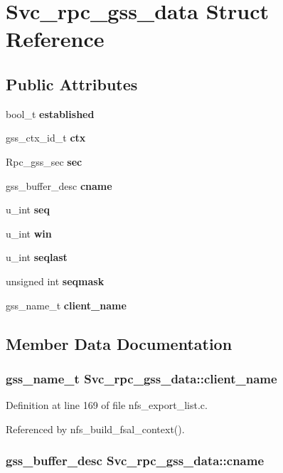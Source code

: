 \section{Svc\_\-rpc\_\-gss\_\-data Struct Reference}
\label{structSvc__rpc__gss__data}
\subsection*{Public Attributes}
\begin{CompactItemize}
\item 
bool\_\-t {\bf established}
\item 
gss\_\-ctx\_\-id\_\-t {\bf ctx}
\item 
Rpc\_\-gss\_\-sec {\bf sec}
\item 
gss\_\-buffer\_\-desc {\bf cname}
\item 
u\_\-int {\bf seq}
\item 
u\_\-int {\bf win}
\item 
u\_\-int {\bf seqlast}
\item 
unsigned int {\bf seqmask}
\item 
gss\_\-name\_\-t {\bf client\_\-name}
\end{CompactItemize}


\subsection{Member Data Documentation}
\subsubsection{\setlength{\rightskip}{0pt plus 5cm}gss\_\-name\_\-t {\bf Svc\_\-rpc\_\-gss\_\-data::client\_\-name}}\label{structSvc__rpc__gss__data_o8}




Definition at line 169 of file nfs\_\-export\_\-list.c.

Referenced by nfs\_\-build\_\-fsal\_\-context().
\subsubsection{\setlength{\rightskip}{0pt plus 5cm}gss\_\-buffer\_\-desc {\bf Svc\_\-rpc\_\-gss\_\-data::cname}}\label{structSvc__rpc__gss__data_o3}




